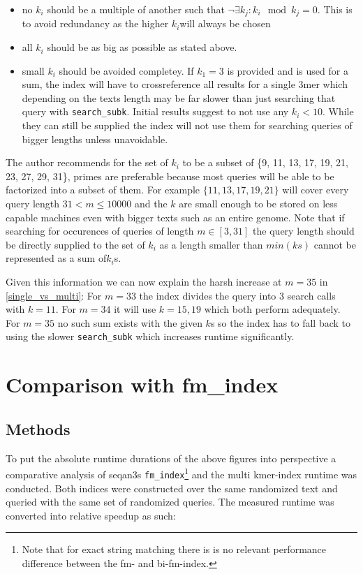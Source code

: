 \begin{itemize}
\item no $k_{i}$ should be a multiple of another such that $\lnot\exists k_{j}:k_{i}\mod k_{j}=0$.
This is to avoid redundancy as the higher $k_{i}$will always be chosen
\item all $k_{i}$ should be as big as possible as stated above.
\item small $k_{i}$ should be avoided completey. If $k_{1}=3$ is provided
and is used for a sum, the index will have to crossreference all results
for a single 3mer which depending on the texts length may be far slower
than just searching that query with \lstinline{search_subk}. Initial
results suggest to not use any $k_{i}<10$. While they can still be supplied
the index will not use them for searching queries of bigger lengths unless unavoidable.
\end{itemize}
The author recommends for the set of $k_{i}$ to be a subset of \{9,
11, 13, 17, 19, 21, 23, 27, 29, 31\}, primes are preferable because
most queries will be able to be factorized into a subset of them.
For example $\{11,13,17,19,21\}$ will cover every query length $31<m\leq10000$
and the $k$ are small enough to be stored on less capable machines
even with bigger texts such as an entire genome. Note that if searching
for occurences of queries of length $m\in[3,31]$ the query length
should be directly supplied to the set of $k_{i}$ as a length smaller
than $min(ks)$ cannot be represented as a sum of$k_{i}$s.

Given this information we can now explain the harsh increase at $m=35$ in \ref{single_vs_multi}: For $m=33$ the index
divides the query into 3 search calls with $k=11$. For $m=34$ it will use $k=15, 19$ which both perform adequately.
For $m=35$ no such sum exists with the given $k$s so the index has to fall back to using the slower \lstinline{search_subk}
which increases runtime significantly.

\section{Comparison with fm\_index}
\subsection{Methods}
To put the absolute runtime durations of the above figures into perspective a comparative analysis
of seqan3s \lstinline{fm_index}\footnote{Note that for exact string matching there is is no relevant performance
difference between the fm- and bi-fm-index.} and the multi kmer-index runtime was conducted. Both indices were
constructed over the same randomized text and queried with the same set of randomized queries. The measured runtime was
converted into relative speedup as such:

